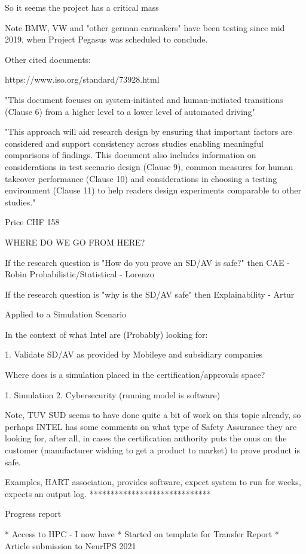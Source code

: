 So it seems the project has a critical mass

Note BMW, VW and "other german carmakers" have been testing since mid 2019, when Project Pegasus was scheduled to conclude.

Other cited documents:

https://www.iso.org/standard/73928.html

"This document focuses on system-initiated and human-initiated transitions (Clause 6) from a higher level to a lower level of automated driving"

"This approach will aid research design by ensuring that important factors are considered and support consistency across studies enabling meaningful comparisons of findings. This document also includes information on considerations in test scenario design (Clause 9), common measures for human takeover performance (Clause 10) and considerations in choosing a testing environment (Clause 11) to help readers design experiments comparable to other studies."

Price CHF 158

WHERE DO WE GO FROM HERE?

If the research question is "How do you prove an SD/AV is safe?" then
CAE - Robin
Probabilistic/Statistical - Lorenzo

If the research question is "why is the SD/AV safe" then
Explainability - Artur

Applied to a Simulation Scenario

In the context of what Intel are (Probably) looking for:

1. Validate SD/AV as provided by Mobileye and subsidiary companies

Where does is a simulation placed in the certification/approvals space?

1. Simulation
2. Cybersecurity (running model is software)


Note, TUV SUD seems to have done quite a bit of work on this topic already, so perhaps INTEL has some comments on what type of Safety Assurance they are looking for, after all, in cases the certification authority puts the onus on the customer (manufacturer wishing to get a product to market) to prove product is safe.

Examples, HART association, provides software, expect system to run for weeks, expects an output log.
*****************************

Progress report

* Access to HPC - I now have
* Started on template for Transfer Report
* Article submission to NeurIPS 2021


